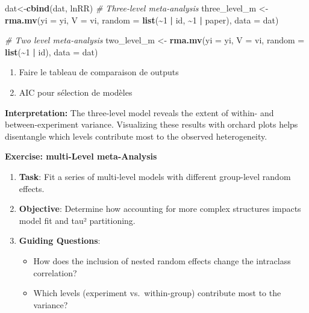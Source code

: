 \documentclass[
]{book}
\newenvironment{Shaded}{\begin{snugshade}}{\end{snugshade}}
\newcommand{\AttributeTok}[1]{\textcolor[rgb]{0.13,0.29,0.53}{#1}}
\newcommand{\CommentTok}[1]{\textcolor[rgb]{0.56,0.35,0.01}{\textit{#1}}}
\newcommand{\DecValTok}[1]{\textcolor[rgb]{0.00,0.00,0.81}{#1}}
\newcommand{\FunctionTok}[1]{\textcolor[rgb]{0.13,0.29,0.53}{\textbf{#1}}}
\newcommand{\NormalTok}[1]{#1}
\newcommand{\OtherTok}[1]{\textcolor[rgb]{0.56,0.35,0.01}{#1}}
\newcommand{\SpecialCharTok}[1]{\textcolor[rgb]{0.81,0.36,0.00}{\textbf{#1}}}
\providecommand{\tightlist}{%
  \setlength{\itemsep}{0pt}\setlength{\parskip}{0pt}}
\begin{document}
\begin{Shaded}
\begin{Highlighting}[]
\NormalTok{dat}\OtherTok{\textless{}{-}}\FunctionTok{cbind}\NormalTok{(dat, lnRR)}
\CommentTok{\# Three{-}level meta{-}analysis}
\NormalTok{three\_level\_m }\OtherTok{\textless{}{-}} \FunctionTok{rma.mv}\NormalTok{(}\AttributeTok{yi =}\NormalTok{ yi, }\AttributeTok{V =}\NormalTok{ vi, }\AttributeTok{random =} \FunctionTok{list}\NormalTok{(}\SpecialCharTok{\textasciitilde{}}\DecValTok{1} \SpecialCharTok{|}\NormalTok{ id, }\SpecialCharTok{\textasciitilde{}}\DecValTok{1} \SpecialCharTok{|}\NormalTok{ paper), }\AttributeTok{data =}\NormalTok{ dat)}

\CommentTok{\# Two level meta{-}analysis}
\NormalTok{two\_level\_m }\OtherTok{\textless{}{-}} \FunctionTok{rma.mv}\NormalTok{(}\AttributeTok{yi =}\NormalTok{ yi, }\AttributeTok{V =}\NormalTok{ vi, }\AttributeTok{random =} \FunctionTok{list}\NormalTok{(}\SpecialCharTok{\textasciitilde{}}\DecValTok{1} \SpecialCharTok{|}\NormalTok{ id), }\AttributeTok{data =}\NormalTok{ dat)}
\end{Highlighting}
\end{Shaded}

\begin{enumerate}
\def\labelenumi{\arabic{enumi}.}
\tightlist
\item
  Faire le tableau de comparaison de outputs
\item
  AIC pour sélection de modèles
\end{enumerate}

\textbf{Interpretation:} The three-level model reveals the extent of within- and between-experiment variance. Visualizing these results with orchard plots helps disentangle which levels contribute most to the observed heterogeneity.

\textbf{Exercise: multi-Level meta-Analysis}

\begin{enumerate}
\def\labelenumi{\arabic{enumi}.}
\item
  \textbf{Task}: Fit a series of multi-level models with different group-level random effects.
\item
  \textbf{Objective}: Determine how accounting for more complex structures impacts model fit and tau² partitioning.
\item
  \textbf{Guiding Questions}:

  \begin{itemize}
  \item
    How does the inclusion of nested random effects change the intraclass correlation?
  \item
    Which levels (experiment vs.~within-group) contribute most to the variance?
  \end{itemize}
\end{enumerate}
\end{document}
